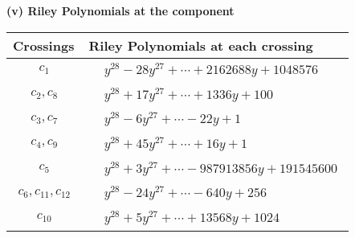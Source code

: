 \documentclass[1p]{elsarticle_modified}
\theoremstyle{definition}
\begin{document}
\flushleft \textbf{(v) Riley Polynomials at the component}\newline \\
\begin{tabular}{m{50pt}|m{274pt}}
Crossings & \hspace{64pt}Riley Polynomials at each crossing \\
\hline $$\begin{aligned}c_{1}\end{aligned}$$&$\begin{aligned}
&y^{28}-28 y^{27}+\cdots+2162688 y+1048576
\end{aligned}$\\
\hline $$\begin{aligned}c_{2},c_{8}\end{aligned}$$&$\begin{aligned}
&y^{28}+17 y^{27}+\cdots+1336 y+100
\end{aligned}$\\
\hline $$\begin{aligned}c_{3},c_{7}\end{aligned}$$&$\begin{aligned}
&y^{28}-6 y^{27}+\cdots-22 y+1
\end{aligned}$\\
\hline $$\begin{aligned}c_{4},c_{9}\end{aligned}$$&$\begin{aligned}
&y^{28}+45 y^{27}+\cdots+16 y+1
\end{aligned}$\\
\hline $$\begin{aligned}c_{5}\end{aligned}$$&$\begin{aligned}
&y^{28}+3 y^{27}+\cdots-987913856 y+191545600
\end{aligned}$\\
\hline $$\begin{aligned}c_{6},c_{11},c_{12}\end{aligned}$$&$\begin{aligned}
&y^{28}-24 y^{27}+\cdots-640 y+256
\end{aligned}$\\
\hline $$\begin{aligned}c_{10}\end{aligned}$$&$\begin{aligned}
&y^{28}+5 y^{27}+\cdots+13568 y+1024
\end{aligned}$\\
\hline
\end{tabular}\\~\\
\end{document}
